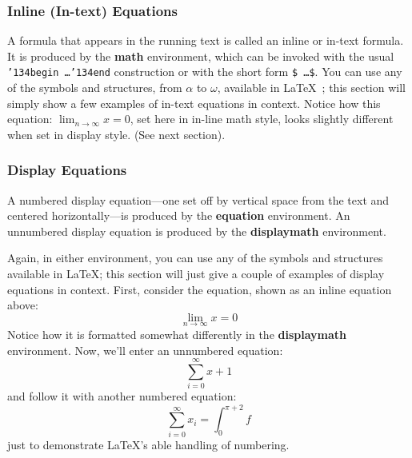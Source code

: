 \subsubsection{Inline (In-text) Equations}
A formula that appears in the running text is called an
inline or in-text formula.  It is produced by the
\textbf{math} environment, which can be
invoked with the usual \texttt{{\char'134}begin\,\ldots{\char'134}end}
construction or with the short form \texttt{\$\,\ldots\$}. You
can use any of the symbols and structures,
from $\alpha$ to $\omega$, available in
\LaTeX~\cite{Lamport:LaTeX}; this section will simply show a
few examples of in-text equations in context. Notice how
this equation:
\begin{math}
  \lim_{n\rightarrow \infty}x=0
\end{math},
set here in in-line math style, looks slightly different when
set in display style.  (See next section).

\subsubsection{Display Equations}
A numbered display equation---one set off by vertical space from the
text and centered horizontally---is produced by the \textbf{equation}
environment. An unnumbered display equation is produced by the
\textbf{displaymath} environment.

Again, in either environment, you can use any of the symbols
and structures available in \LaTeX\@; this section will just
give a couple of examples of display equations in context.
First, consider the equation, shown as an inline equation above:
\begin{equation}
  \lim_{n\rightarrow \infty}x=0
\end{equation}
Notice how it is formatted somewhat differently in
the \textbf{displaymath}
environment.  Now, we'll enter an unnumbered equation:
\begin{displaymath}
  \sum_{i=0}^{\infty} x + 1
\end{displaymath}
and follow it with another numbered equation:
\begin{equation}
  \sum_{i=0}^{\infty}x_i=\int_{0}^{\pi+2} f
\end{equation}
just to demonstrate \LaTeX's able handling of numbering.

